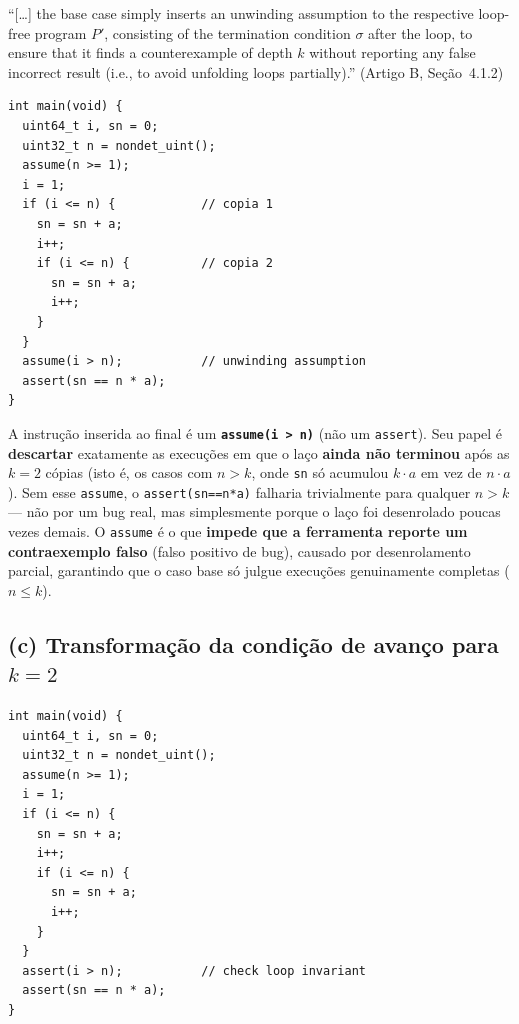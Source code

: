 \documentclass[12pt,a4paper]{article}
\newcommand{\vv}[1]{\texttt{#1}}
\begin{document}
\begin{tcolorbox}[quotebox]
``[\ldots] the base case simply inserts an unwinding assumption to the respective loop-free
program $P'$, consisting of the termination condition $\sigma$ after the loop, to ensure that
it finds a counterexample of depth $k$ without reporting any false incorrect result (i.e., to
avoid unfolding loops partially).'' (Artigo B, Se\c{c}\~ao~4.1.2)
\end{tcolorbox}

\begin{lstlisting}[style=cstyle,caption={Caso base, $k=2$ (padr\~ao da Fig.\ 9 do Artigo B)}]
int main(void) {
  uint64_t i, sn = 0;
  uint32_t n = nondet_uint();
  assume(n >= 1);
  i = 1;
  if (i <= n) {            // copia 1
    sn = sn + a;
    i++;
    if (i <= n) {          // copia 2
      sn = sn + a;
      i++;
    }
  }
  assume(i > n);           // unwinding assumption
  assert(sn == n * a);
}
\end{lstlisting}

\begin{tcolorbox}[resultbox]
A instru\c{c}\~ao inserida ao final \'e um \textbf{\vv{assume(i > n)}} (n\~ao um \vv{assert}).
Seu papel \'e \textbf{descartar} exatamente as execu\c{c}\~oes em que o la\c{c}o \textbf{ainda
n\~ao terminou} ap\'os as $k=2$ c\'opias (isto \'e, os casos com $n>k$, onde \vv{sn} s\'o
acumulou $k\cdot a$ em vez de $n\cdot a$). Sem esse \vv{assume}, o \vv{assert(sn==n*a)}
falharia trivialmente para qualquer $n>k$ --- n\~ao por um bug real, mas simplesmente porque o
la\c{c}o foi desenrolado poucas vezes demais. O \vv{assume} \'e o que \textbf{impede que a
ferramenta reporte um contraexemplo falso} (falso positivo de bug), causado por
desenrolamento parcial, garantindo que o caso base s\'o julgue execu\c{c}\~oes genuinamente
completas ($n\le k$).
\end{tcolorbox}

\subsection{(c) Transformação da condição de avanço para $k=2$}

\begin{lstlisting}[style=cstyle,caption={Condição de avanço (\emph{forward condition}), $k=2$ (padrão da Fig.\ 10 do Artigo B)}]
int main(void) {
  uint64_t i, sn = 0;
  uint32_t n = nondet_uint();
  assume(n >= 1);
  i = 1;
  if (i <= n) {
    sn = sn + a;
    i++;
    if (i <= n) {
      sn = sn + a;
      i++;
    }
  }
  assert(i > n);           // check loop invariant
  assert(sn == n * a);
}
\end{lstlisting}
\end{document}
